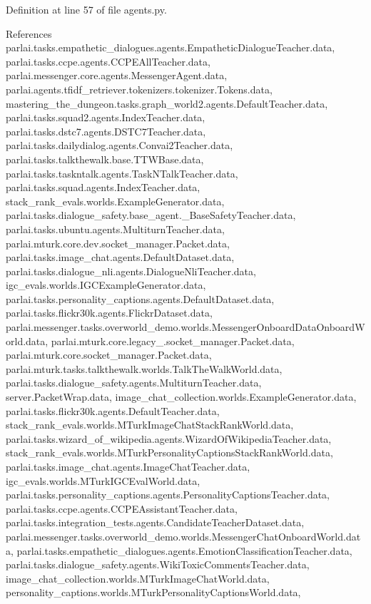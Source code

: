 Definition at line 57 of file agents.\+py.



References parlai.\+tasks.\+empathetic\+\_\+dialogues.\+agents.\+Empathetic\+Dialogue\+Teacher.\+data, parlai.\+tasks.\+ccpe.\+agents.\+C\+C\+P\+E\+All\+Teacher.\+data, parlai.\+messenger.\+core.\+agents.\+Messenger\+Agent.\+data, parlai.\+agents.\+tfidf\+\_\+retriever.\+tokenizers.\+tokenizer.\+Tokens.\+data, mastering\+\_\+the\+\_\+dungeon.\+tasks.\+graph\+\_\+world2.\+agents.\+Default\+Teacher.\+data, parlai.\+tasks.\+squad2.\+agents.\+Index\+Teacher.\+data, parlai.\+tasks.\+dstc7.\+agents.\+D\+S\+T\+C7\+Teacher.\+data, parlai.\+tasks.\+dailydialog.\+agents.\+Convai2\+Teacher.\+data, parlai.\+tasks.\+talkthewalk.\+base.\+T\+T\+W\+Base.\+data, parlai.\+tasks.\+taskntalk.\+agents.\+Task\+N\+Talk\+Teacher.\+data, parlai.\+tasks.\+squad.\+agents.\+Index\+Teacher.\+data, stack\+\_\+rank\+\_\+evals.\+worlds.\+Example\+Generator.\+data, parlai.\+tasks.\+dialogue\+\_\+safety.\+base\+\_\+agent.\+\_\+\+Base\+Safety\+Teacher.\+data, parlai.\+tasks.\+ubuntu.\+agents.\+Multiturn\+Teacher.\+data, parlai.\+mturk.\+core.\+dev.\+socket\+\_\+manager.\+Packet.\+data, parlai.\+tasks.\+image\+\_\+chat.\+agents.\+Default\+Dataset.\+data, parlai.\+tasks.\+dialogue\+\_\+nli.\+agents.\+Dialogue\+Nli\+Teacher.\+data, igc\+\_\+evals.\+worlds.\+I\+G\+C\+Example\+Generator.\+data, parlai.\+tasks.\+personality\+\_\+captions.\+agents.\+Default\+Dataset.\+data, parlai.\+tasks.\+flickr30k.\+agents.\+Flickr\+Dataset.\+data, parlai.\+messenger.\+tasks.\+overworld\+\_\+demo.\+worlds.\+Messenger\+Onboard\+Data\+Onboard\+World.\+data, parlai.\+mturk.\+core.\+legacy\+\_.\+socket\+\_\+manager.\+Packet.\+data, parlai.\+mturk.\+core.\+socket\+\_\+manager.\+Packet.\+data, parlai.\+mturk.\+tasks.\+talkthewalk.\+worlds.\+Talk\+The\+Walk\+World.\+data, parlai.\+tasks.\+dialogue\+\_\+safety.\+agents.\+Multiturn\+Teacher.\+data, server.\+Packet\+Wrap.\+data, image\+\_\+chat\+\_\+collection.\+worlds.\+Example\+Generator.\+data, parlai.\+tasks.\+flickr30k.\+agents.\+Default\+Teacher.\+data, stack\+\_\+rank\+\_\+evals.\+worlds.\+M\+Turk\+Image\+Chat\+Stack\+Rank\+World.\+data, parlai.\+tasks.\+wizard\+\_\+of\+\_\+wikipedia.\+agents.\+Wizard\+Of\+Wikipedia\+Teacher.\+data, stack\+\_\+rank\+\_\+evals.\+worlds.\+M\+Turk\+Personality\+Captions\+Stack\+Rank\+World.\+data, parlai.\+tasks.\+image\+\_\+chat.\+agents.\+Image\+Chat\+Teacher.\+data, igc\+\_\+evals.\+worlds.\+M\+Turk\+I\+G\+C\+Eval\+World.\+data, parlai.\+tasks.\+personality\+\_\+captions.\+agents.\+Personality\+Captions\+Teacher.\+data, parlai.\+tasks.\+ccpe.\+agents.\+C\+C\+P\+E\+Assistant\+Teacher.\+data, parlai.\+tasks.\+integration\+\_\+tests.\+agents.\+Candidate\+Teacher\+Dataset.\+data, parlai.\+messenger.\+tasks.\+overworld\+\_\+demo.\+worlds.\+Messenger\+Chat\+Onboard\+World.\+data, parlai.\+tasks.\+empathetic\+\_\+dialogues.\+agents.\+Emotion\+Classification\+Teacher.\+data, parlai.\+tasks.\+dialogue\+\_\+safety.\+agents.\+Wiki\+Toxic\+Comments\+Teacher.\+data, image\+\_\+chat\+\_\+collection.\+worlds.\+M\+Turk\+Image\+Chat\+World.\+data, personality\+\_\+captions.\+worlds.\+M\+Turk\+Personality\+Captions\+World.\+data, 